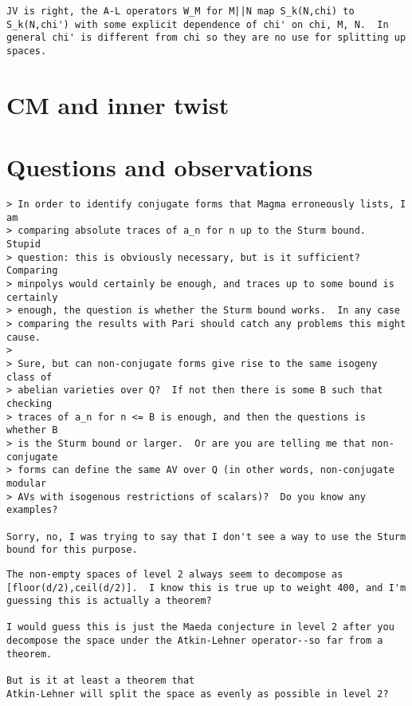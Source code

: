 \documentclass[11pt]{amsart}
\numberwithin{equation}{subsection}
\theoremstyle{definition}
\begin{document}
\begin{verbatim}
JV is right, the A-L operators W_M for M||N map S_k(N,chi) to S_k(N,chi') with some explicit dependence of chi' on chi, M, N.  In general chi' is different from chi so they are no use for splitting up spaces.
\end{verbatim}

\section{CM and inner twist}

\section{Questions and observations}

\begin{verbatim}
> In order to identify conjugate forms that Magma erroneously lists, I am
> comparing absolute traces of a_n for n up to the Sturm bound.  Stupid
> question: this is obviously necessary, but is it sufficient?  Comparing
> minpolys would certainly be enough, and traces up to some bound is certainly
> enough, the question is whether the Sturm bound works.  In any case
> comparing the results with Pari should catch any problems this might cause.
>
> Sure, but can non-conjugate forms give rise to the same isogeny class of
> abelian varieties over Q?  If not then there is some B such that checking
> traces of a_n for n <= B is enough, and then the questions is whether B
> is the Sturm bound or larger.  Or are you are telling me that non-conjugate
> forms can define the same AV over Q (in other words, non-conjugate modular
> AVs with isogenous restrictions of scalars)?  Do you know any examples?

Sorry, no, I was trying to say that I don't see a way to use the Sturm
bound for this purpose.
\end{verbatim}

\begin{verbatim}
The non-empty spaces of level 2 always seem to decompose as [floor(d/2),ceil(d/2)].  I know this is true up to weight 400, and I'm guessing this is actually a theorem?

I would guess this is just the Maeda conjecture in level 2 after you
decompose the space under the Atkin-Lehner operator--so far from a
theorem.

But is it at least a theorem that
Atkin-Lehner will split the space as evenly as possible in level 2?
\end{verbatim}
\end{document}
